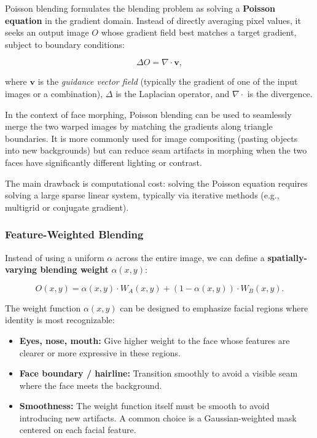 Poisson blending formulates the blending problem as solving a \textbf{Poisson equation} in the
gradient domain. Instead of directly averaging pixel values, it seeks an output image $O$ whose
gradient field best matches a target gradient, subject to boundary conditions:

\begin{equation}
    \Delta O = \nabla \cdot \mathbf{v},
\end{equation}

where $\mathbf{v}$ is the \emph{guidance vector field} (typically the gradient of one of the
input images or a combination), $\Delta$ is the Laplacian operator, and $\nabla \cdot$ is the
divergence.

In the context of face morphing, Poisson blending can be used to seamlessly merge the two
warped images by matching the gradients along triangle boundaries. It is more commonly used
for image compositing (pasting objects into new backgrounds) but can reduce seam artifacts in
morphing when the two faces have significantly different lighting or contrast.

The main drawback is computational cost: solving the Poisson equation requires solving a large
sparse linear system, typically via iterative methods (e.g., multigrid or conjugate gradient).

\subsubsection{Feature-Weighted Blending}

Instead of using a uniform $\alpha$ across the entire image, we can define a
\textbf{spatially-varying blending weight} $\alpha(x, y)$:

\begin{equation}
    O(x, y) = \alpha(x, y) \cdot W_A(x, y) + (1 - \alpha(x, y)) \cdot W_B(x, y).
\end{equation}

The weight function $\alpha(x, y)$ can be designed to emphasize facial regions where identity
is most recognizable:

\begin{itemize}
    \item \textbf{Eyes, nose, mouth:} Give higher weight to the face whose features are clearer
          or more expressive in these regions.
    \item \textbf{Face boundary / hairline:} Transition smoothly to avoid a visible seam where
          the face meets the background.
    \item \textbf{Smoothness:} The weight function itself must be smooth to avoid introducing
          new artifacts. A common choice is a Gaussian-weighted mask centered on each facial
          feature.
\end{itemize}

